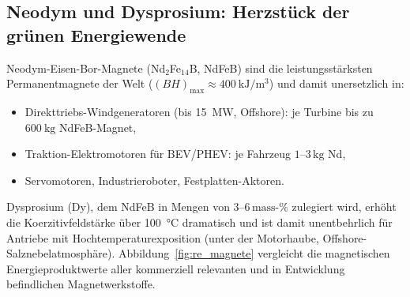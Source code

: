 ﻿\documentclass[12pt, a4paper]{report}
\theoremstyle{definition}
\theoremstyle{remark}
\begin{document}
\subsection{Neodym und Dysprosium: Herzstück der grünen Energiewende}

Neodym-Eisen-Bor-Magnete (Nd$_2$Fe$_{14}$B, NdFeB) sind die leistungsstärksten
Permanentmagnete der Welt ($(BH)_{\max} \approx \SI{400}{\kilo\joule\per\cubic\metre}$)
und damit unersetzlich in:
\begin{itemize}
  \item Direkttriebs-Windgeneratoren (bis \SI{15}{\mega\watt}, Offshore): je
        Turbine bis zu $\SI{600}{\kilogram}$ NdFeB-Magnet,
  \item Traktion-Elektromotoren für BEV/PHEV: je Fahrzeug $1$--$3\,\text{kg}$ Nd,
  \item Servomotoren, Industrieroboter, Festplatten-Aktoren.
\end{itemize}
Dysprosium (Dy), dem NdFeB in Mengen von $3$--$6\,\text{mass-\%}$ zulegiert
wird, erhöht die Koerzitivfeldstärke über \SI{100}{\celsius} dramatisch und
ist damit unentbehrlich für Antriebe mit Hochtemperaturexposition (unter der
Motorhaube, Offshore-Salznebelatmosphäre). Abbildung~\ref{fig:re_magnete}
vergleicht die magnetischen Energieproduktwerte aller kommerziell relevanten
und in Entwicklung befindlichen Magnetwerkstoffe.
\end{document}
